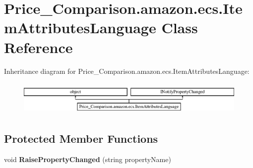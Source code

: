 \hypertarget{class_price___comparison_1_1amazon_1_1ecs_1_1_item_attributes_language}{\section{Price\-\_\-\-Comparison.\-amazon.\-ecs.\-Item\-Attributes\-Language Class Reference}
\label{class_price___comparison_1_1amazon_1_1ecs_1_1_item_attributes_language}
}


 


Inheritance diagram for Price\-\_\-\-Comparison.\-amazon.\-ecs.\-Item\-Attributes\-Language\-:\begin{figure}[H]
\begin{center}
\leavevmode
\includegraphics[height=1.696970cm]{class_price___comparison_1_1amazon_1_1ecs_1_1_item_attributes_language}
\end{center}
\end{figure}
\subsection*{Protected Member Functions}
\begin{DoxyCompactItemize}
\item 
\hypertarget{class_price___comparison_1_1amazon_1_1ecs_1_1_item_attributes_language_a53dffe777340d19a16ee710ed9a1f687}{void {\bfseries Raise\-Property\-Changed} (string property\-Name)}\label{class_price___comparison_1_1amazon_1_1ecs_1_1_item_attributes_language_a53dffe777340d19a16ee710ed9a1f687}

\end{DoxyCompactItemize}

